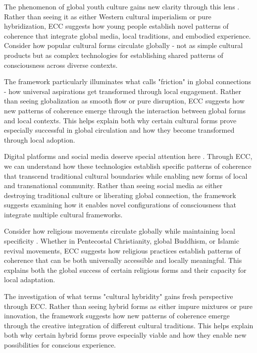 \begin{refsection}
The phenomenon of global youth culture gains new clarity through this lens \cite{iwabuchi2002recentering}. Rather than seeing it as either Western cultural imperialism or pure hybridization, ECC suggests how young people establish novel patterns of coherence that integrate global media, local traditions, and embodied experience. Consider how popular cultural forms circulate globally - not as simple cultural products but as complex technologies for establishing shared patterns of consciousness across diverse contexts.

The framework particularly illuminates what \cite{tsing2005friction} calls "friction" in global connections - how universal aspirations get transformed through local engagement. Rather than seeing globalization as smooth flow or pure disruption, ECC suggests how new patterns of coherence emerge through the interaction between global forms and local contexts. This helps explain both why certain cultural forms prove especially successful in global circulation and how they become transformed through local adoption.

Digital platforms and social media deserve special attention here \cite{castells2010rise}. Through ECC, we can understand how these technologies establish specific patterns of coherence that transcend traditional cultural boundaries while enabling new forms of local and transnational community. Rather than seeing social media as either destroying traditional culture or liberating global connection, the framework suggests examining how it enables novel configurations of consciousness that integrate multiple cultural frameworks.

Consider how religious movements circulate globally while maintaining local specificity \cite{comaroff2009ethnicity}. Whether in Pentecostal Christianity, global Buddhism, or Islamic revival movements, ECC suggests how religious practices establish patterns of coherence that can be both universally accessible and locally meaningful. This explains both the global success of certain religious forms and their capacity for local adaptation.

The investigation of what \cite{kraidy2005hybridity} terms "cultural hybridity" gains fresh perspective through ECC. Rather than seeing hybrid forms as either impure mixtures or pure innovation, the framework suggests how new patterns of coherence emerge through the creative integration of different cultural traditions. This helps explain both why certain hybrid forms prove especially viable and how they enable new possibilities for conscious experience.


\end{refsection}
